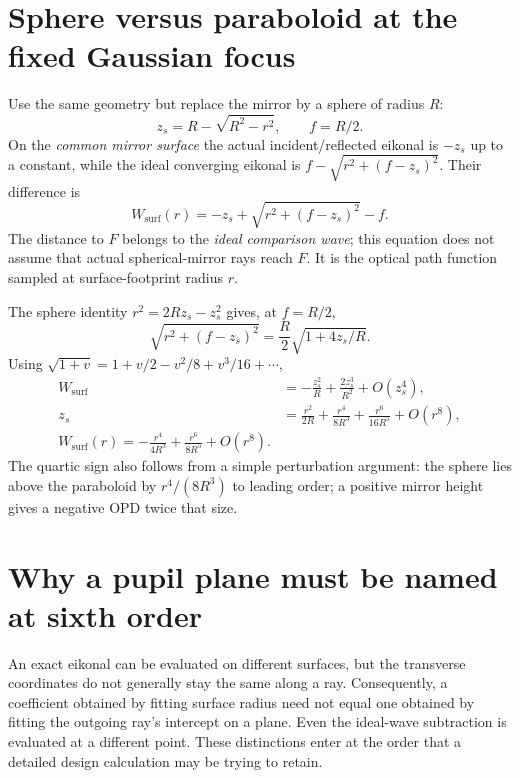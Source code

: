 \section{Sphere versus paraboloid at the fixed Gaussian focus}
Use the same geometry but replace the mirror by a sphere of radius $R$:
\begin{equation}
 z_s=R-\sqrt{R^2-r^2},\qquad f=R/2.
\end{equation}
On the \emph{common mirror surface} the actual incident/reflected
eikonal is $-z_s$ up to a constant, while the ideal converging eikonal
is $f-\sqrt{r^2+(f-z_s)^2}$. Their difference is
\begin{equation}
 W_{\mathrm{surf}}(r)=
    -z_s+\sqrt{r^2+(f-z_s)^2}-f.
 \label{zc:spherereference}
\end{equation}
The distance to $F$ belongs to the \emph{ideal comparison wave}; this
equation does not assume that actual spherical-mirror rays reach $F$.
It is the optical path function sampled at surface-footprint radius $r$.

The sphere identity $r^2=2Rz_s-z_s^2$ gives, at $f=R/2$,
\begin{equation}
 \sqrt{r^2+(f-z_s)^2}=\frac R2\sqrt{1+4z_s/R}.
\end{equation}
Using $\sqrt{1+v}=1+v/2-v^2/8+v^3/16+\cdots$,
\begin{align}
 W_{\mathrm{surf}}&=-\frac{z_s^2}{R}
                         +\frac{2z_s^3}{R^2}+O(z_s^4),\\
 z_s&=\frac{r^2}{2R}+\frac{r^4}{8R^3}
                           +\frac{r^6}{16R^5}+O(r^8),\\
 \boxed{W_{\mathrm{surf}}(r)
       =-\frac{r^4}{4R^3}+\frac{r^6}{8R^5}+O(r^8).}
 \label{zc:sphereseries}
\end{align}
The quartic sign also follows from a simple perturbation argument:
the sphere lies above the paraboloid by $r^4/(8R^3)$ to leading order;
a positive mirror height gives a negative OPD twice that size.

\section{Why a pupil plane must be named at sixth order}
An exact eikonal can be evaluated on different surfaces, but the
transverse coordinates do not generally stay the same along a ray.
Consequently, a coefficient obtained by fitting surface radius need
not equal one obtained by fitting the outgoing ray's intercept on a
plane. Even the ideal-wave subtraction is evaluated at a different
point. These distinctions enter at the order that a detailed design
calculation may be trying to retain.

